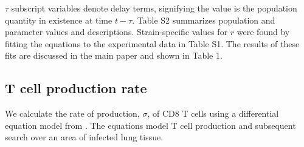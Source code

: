 \documentclass[10pt]{article}
\begin{document}
$\tau$ subscript variables denote delay terms, signifying the value is the population quantity in existence at time $t - \tau$.  Table S2 summarizes population and parameter values and descriptions.  Strain-specific values for $r$ were found by fitting the equations to the experimental data in Table S1.  The results of these fits are discussed in the main paper and shown in Table 1.





\subsection{T cell production rate}

We calculate the rate of production, $\sigma$, of CD8 T cells using a differential equation model from \cite{Miao2010}.  The equations model T cell production and subsequent search over an area of infected lung tissue.
\end{document}
